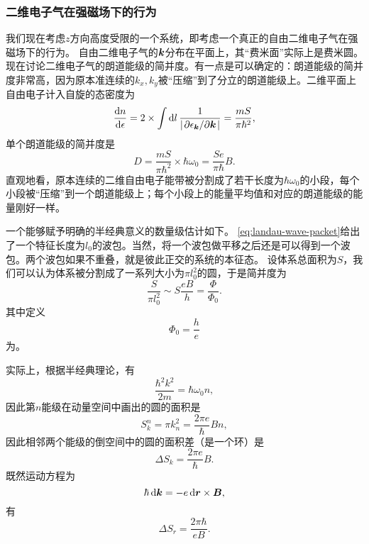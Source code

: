 \subsubsection{二维电子气在强磁场下的行为}\label{sec:2d-electron-magnetic-field}

我们现在考虑$z$方向高度受限的一个系统，即考虑一个真正的自由二维电子气在强磁场下的行为。
自由二维电子气的$\vb*{k}$分布在平面上，其“费米面”实际上是费米圆。
现在讨论二维电子气的朗道能级的简并度。有一点是可以确定的：朗道能级的简并度非常高，因为原本准连续的$k_x, k_y$被“压缩”到了分立的朗道能级上。二维平面上自由电子计入自旋的态密度为
\begin{equation}
    \dv{n}{\epsilon} = 2 \times \int \dd{l} \frac{1}{\abs{\pdv*{\epsilon_{\vb*{k}}}{\vb*{k}}}} = \frac{m S}{\pi \hbar^2},
\end{equation}
单个朗道能级的简并度是
\begin{equation}
    D = \frac{m S}{\pi \hbar^2} \times \hbar \omega_0 = \frac{S e}{\pi \hbar} B.
\end{equation}
直观地看，原本连续的二维自由电子能带被分割成了若干长度为$\hbar \omega_0$的小段，每个小段被“压缩”到一个朗道能级上；每个小段上的能量平均值和对应的朗道能级的能量刚好一样。

一个能够赋予明确的半经典意义的数量级估计如下。
\eqref{eq:landau-wave-packet}给出了一个特征长度为$l_0$的波包。当然，将一个波包做平移之后还是可以得到一个波包。两个波包如果不重叠，就是彼此正交的系统的本征态。
设体系总面积为$S$，我们可以认为体系被分割成了一系列大小为$\pi l_0^2$的圆，于是简并度为
\[
    \frac{S}{\pi l_0^2} \sim S \frac{eB}{h} = \frac{\Phi}{\Phi_0}.
\]
其中定义
\begin{equation}
    \Phi_0 = \frac{h}{e}
\end{equation}
为。

实际上，根据半经典理论，有
\[
    \frac{\hbar^2 k^2}{2m} = \hbar \omega_0 n,
\]
因此第$n$能级在动量空间中画出的圆的面积是
\begin{equation}
    S_k^n = \pi k_n^2 = \frac{2 \pi e}{\hbar} B n,
\end{equation}
因此相邻两个能级的倒空间中的圆的面积差（是一个环）是
\begin{equation}
    \Delta S_k = \frac{2 \pi e}{\hbar} B.
\end{equation}
既然运动方程为
\[
    \hbar \dd{\vb*{k}} = - e \dd{\vb*{r}} \times \vb*{B},
\]
有
\begin{equation}
    \Delta S_r = \frac{2\pi \hbar}{eB}.
\end{equation}

